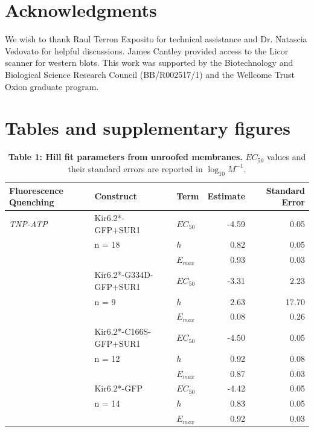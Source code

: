 \documentclass[10pt,lineno, doublespacing]{elife_modified}
\begin{document}
\section{Acknowledgments}
We wish to thank Raul Terron Exposito for technical assistance and Dr. Natascia Vedovato for helpful discussions.
James Cantley provided access to the Licor scanner for western blots.
This work was supported by the Biotechnology and Biological Science Research Council (BB/R002517/1) and the Wellcome Trust Oxion graduate program.



\FloatBarrier

\section{Tables and supplementary figures}
\begin{table}
\centering\begingroup
\begin{tabular}{p{32mm} l l r r}
\toprule
\textbf{Fluorescence Quenching} & Construct & Term & Estimate & Standard Error\\
\midrule
\textit{TNP-ATP} & Kir6.2*-GFP+SUR1       & $EC_{50}$ & -4.59 & 0.05\\
                 & n = 18                 & $h$       & 0.82  & 0.05\\
                 &                        & $E_{max}$ & 0.93  & 0.03\\
\cmidrule{2-5}
                 & Kir6.2*-G334D-GFP+SUR1 & $EC_{50}$ & -3.31 & 2.23\\
                 & n = 9                  & $h$       & 2.63  & 17.70\\
                 &                        & $E_{max}$ & 0.08  & 0.26\\
\cmidrule{2-5}
                 & Kir6.2*-C166S-GFP+SUR1 & $EC_{50}$ & -4.50 & 0.05\\
                 & n = 12                 & $h$       & 0.92  & 0.08\\
                 &                        & $E_{max}$ & 0.87  & 0.03\\
\cmidrule{2-5}
                 & Kir6.2*-GFP           & $EC_{50}$ & -4.42 & 0.05\\
                 & n = 14                & $h$       & 0.83  & 0.05\\
                 &                       & $E_{max}$ & 0.92  & 0.03\\
\midrule
\end{tabular}
\caption{\label{table:um} \textbf{Table 1: Hill fit parameters from unroofed membranes.} $EC_{50}$ values and their standard errors are reported in $\log_{10}M^{-1}$.}
\endgroup{}
\end{table}
\end{document}
